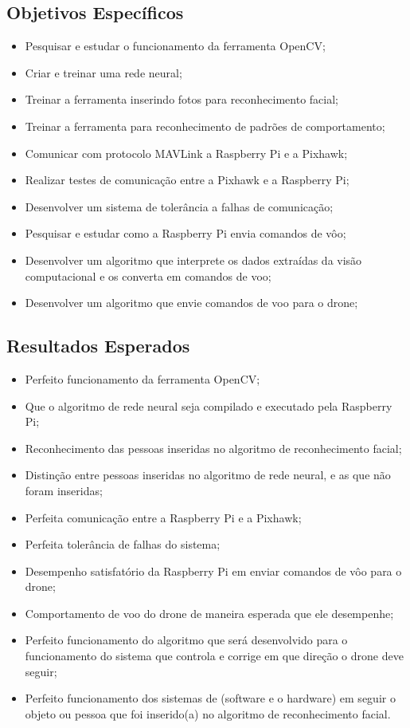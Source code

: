 \subsection{Objetivos Específicos}
\begin{itemize}
    \item Pesquisar e estudar o funcionamento da ferramenta OpenCV;
    \item Criar e treinar uma rede neural;
    \item Treinar a ferramenta inserindo fotos para reconhecimento facial;
    \item Treinar a ferramenta para reconhecimento de padrões de comportamento;
    \item Comunicar com protocolo MAVLink a Raspberry Pi e a Pixhawk;
    \item Realizar testes de comunicação entre a Pixhawk e a Raspberry Pi;
    \item Desenvolver um sistema de tolerância a falhas de comunicação;
    \item Pesquisar e estudar como a Raspberry Pi envia comandos de vôo;
    \item Desenvolver um algoritmo que interprete os dados extraídas da visão computacional e os converta em comandos de voo;
    \item Desenvolver um algoritmo que envie comandos de voo para o drone;
\end{itemize}

\subsection{Resultados Esperados}
\begin{itemize}
    \item Perfeito funcionamento da ferramenta OpenCV;
    \item Que o algoritmo de rede neural seja compilado e executado pela Raspberry Pi;
    \item Reconhecimento das pessoas inseridas no algoritmo de reconhecimento facial;
    \item Distinção entre pessoas inseridas no algoritmo de rede neural, e as que não foram inseridas;
    \item Perfeita comunicação entre a Raspberry Pi e a Pixhawk;
    \item Perfeita tolerância de falhas do sistema;
    \item Desempenho satisfatório da Raspberry Pi em enviar comandos de vôo para o drone;
    \item Comportamento de voo do drone de maneira esperada que ele desempenhe;
    \item Perfeito funcionamento do algoritmo que será desenvolvido para o funcionamento do sistema que controla e corrige em que direção o drone deve seguir;
    \item Perfeito funcionamento dos sistemas de (software e o hardware) em seguir o objeto ou pessoa que foi inserido(a) no algoritmo de reconhecimento facial.
\end{itemize}

